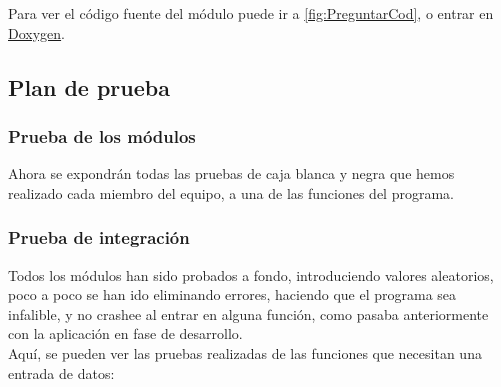 Para ver el código fuente del módulo puede ir a \ref{fig:PreguntarCod}, o entrar en \href{DOC_DOXYGEN/preguntar_8h_source.html}{Doxygen}.
\label{fig:Preguntar}

\subsection{Plan de prueba}

\subsubsection{Prueba de los módulos}

Ahora se expondrán todas las pruebas de caja blanca y negra que hemos realizado cada miembro del equipo, a una de las funciones del programa.









\subsubsection{Prueba de integración}

Todos los módulos han sido probados a fondo, introduciendo valores aleatorios, poco a poco se han ido eliminando errores, haciendo que el programa sea infalible,
y no crashee al entrar en alguna función, como pasaba anteriormente con la aplicación en fase de desarrollo.\\

Aquí, se pueden ver las pruebas realizadas de las funciones que necesitan una entrada de datos:

